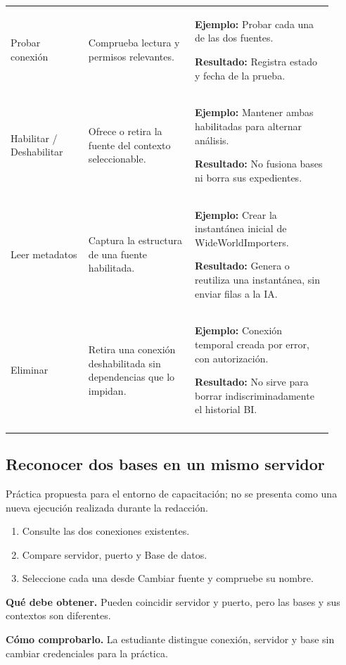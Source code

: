 \begin{longtable}{@{}>{\RaggedRight\arraybackslash}p{0.22\linewidth}>{\RaggedRight\arraybackslash}p{0.3\linewidth}>{\RaggedRight\arraybackslash}p{0.39\linewidth}@{}}
\addlinespace[3pt]
Probar conexión & Comprueba lectura y permisos relevantes. & \textbf{Ejemplo:} Probar cada una de las dos fuentes.\par\smallskip\textbf{Resultado:} Registra estado y fecha de la prueba. \\
\addlinespace[3pt]
Habilitar / Deshabilitar & Ofrece o retira la fuente del contexto seleccionable. & \textbf{Ejemplo:} Mantener ambas habilitadas para alternar análisis.\par\smallskip\textbf{Resultado:} No fusiona bases ni borra sus expedientes. \\
\addlinespace[3pt]
Leer metadatos & Captura la estructura de una fuente habilitada. & \textbf{Ejemplo:} Crear la instantánea inicial de WideWorldImporters.\par\smallskip\textbf{Resultado:} Genera o reutiliza una instantánea, sin enviar filas a la IA. \\
\addlinespace[3pt]
Eliminar & Retira una conexión deshabilitada sin dependencias que lo impidan. & \textbf{Ejemplo:} Conexión temporal creada por error, con autorización.\par\smallskip\textbf{Resultado:} No sirve para borrar indiscriminadamente el historial BI. \\
\addlinespace[3pt]
\end{longtable}
\endgroup

\subsection{Reconocer dos bases en un mismo servidor}
Práctica propuesta para el entorno de capacitación; no se presenta como una nueva ejecución realizada durante la redacción.

\begin{enumerate}
\item Consulte las dos conexiones existentes.
\item Compare servidor, puerto y Base de datos.
\item Seleccione cada una desde Cambiar fuente y compruebe su nombre.
\end{enumerate}

\textbf{Qué debe obtener.} Pueden coincidir servidor y puerto, pero las bases y sus contextos son diferentes.

\textbf{Cómo comprobarlo.} La estudiante distingue conexión, servidor y base sin cambiar credenciales para la práctica.

